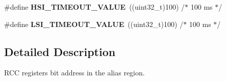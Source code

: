 \begin{DoxyCompactItemize}
\item 
\#define {\bfseries H\+S\+I\+\_\+\+T\+I\+M\+E\+O\+U\+T\+\_\+\+V\+A\+L\+UE}~((uint32\+\_\+t)100)  /$\ast$ 100 ms $\ast$/\hypertarget{group___r_c_c___bit_address___alias_region_gad9e56670dcbbe9dbc3a8971b36bbec58}{}\label{group___r_c_c___bit_address___alias_region_gad9e56670dcbbe9dbc3a8971b36bbec58}

\item 
\#define {\bfseries L\+S\+I\+\_\+\+T\+I\+M\+E\+O\+U\+T\+\_\+\+V\+A\+L\+UE}~((uint32\+\_\+t)100)  /$\ast$ 100 ms $\ast$/\hypertarget{group___r_c_c___bit_address___alias_region_gad52c7f624c88b0c82ab41b9dbd2b347f}{}\label{group___r_c_c___bit_address___alias_region_gad52c7f624c88b0c82ab41b9dbd2b347f}

\end{DoxyCompactItemize}


\subsection{Detailed Description}
R\+CC registers bit address in the alias region. 

